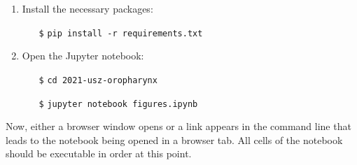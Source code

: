 \begin{tcolorbox}[title=\faIcon{recycle} Reproducibility, parbox=false]
\begin{enumerate}
        \item Install the necessary packages:
        \begin{itemize}[leftmargin=10mm]
            \setlength\itemsep{-0.5em}
            \item[\texttt{\$}] \verb|pip install -r requirements.txt|
        \end{itemize}

        \item Open the Jupyter notebook:
        \begin{itemize}[leftmargin=10mm]
            \setlength\itemsep{-0.5em}
            \item[\texttt{\$}] \verb|cd 2021-usz-oropharynx|
            \item[\texttt{\$}] \verb|jupyter notebook figures.ipynb|
        \end{itemize}
    \end{enumerate}

    Now, either a browser window opens or a link appears in the command line that leads to the notebook being opened in a browser tab. All cells of the notebook should be executable in order at this point.
\end{tcolorbox}